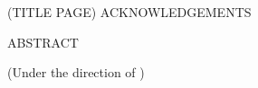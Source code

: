 (TITLE PAGE)
\newpage
ACKNOWLEDGEMENTS


\newpage
ABSTRACT

\uppercase{\EDSAUTHOR}

\EDSTITLE

(Under the direction of {\EDSADVISORUC})


\newpage
\tableofcontents
\newpage
\listoftables
\newpage
\listoffigures
\newpage
